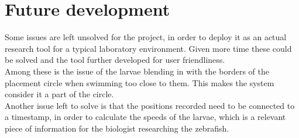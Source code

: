 \documentclass[10pt,a4paper, singlespace]{article}
\begin{document}
\section{Future development}
Some issues are left unsolved for the project, in order to deploy it as an actual research tool for a typical laboratory environment. Given more time these could be solved and the tool further developed for user friendliness.\\ 
Among these is the issue of the larvae blending in with the borders of the placement circle when swimming too close to them. This makes the system consider it a part of the circle.\\
Another issue left to solve is that the positions recorded need to be connected to a timestamp, in order to calculate the speeds of the larvae, which is a relevant piece of information for the biologist researching the zebrafish.   
\end{document}
